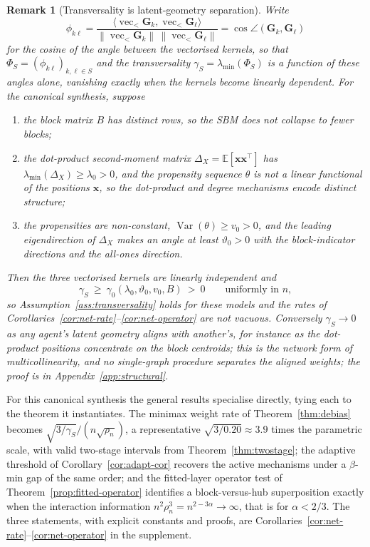 \documentclass[12pt]{article}
\newtheorem{remark}{Remark}
\newcommand{\E}{\mathbb{E}}
\newcommand{\1}{\mathbf{1}}
\newcommand{\x}{\mathbf{x}}
\newcommand{\norm}[1]{\left\lVert#1\right\rVert}
\newcommand{\inner}[2]{\langle #1, #2 \rangle}
\begin{document}
\begin{remark}[Transversality is latent-geometry separation]
\label{prop:transversality-geom}
Write
\[
\phi_{k\ell}=\frac{\inner{\operatorname{vec}_<\mathbf G_k}{\operatorname{vec}_<\mathbf G_\ell}}{\norm{\operatorname{vec}_<\mathbf G_k}\,\norm{\operatorname{vec}_<\mathbf G_\ell}}=\cos\angle(\mathbf G_k,\mathbf G_\ell)
\]
for the cosine of the angle between the vectorised kernels, so
that $\Phi_S=(\phi_{k\ell})_{k,\ell\in S}$ and the transversality $\gamma_S=\lambda_{\min}(\Phi_S)$ is a
function of these angles alone, vanishing exactly when the kernels become linearly dependent. For the
canonical synthesis, suppose
\begin{enumerate}[label=(\roman*),leftmargin=2em,itemsep=1pt]
\item the block matrix $B$ has distinct rows, so the SBM does not collapse to fewer blocks;
\item the dot-product second-moment matrix $\Delta_X=\E[\x\x^\top]$ has $\lambda_{\min}(\Delta_X)\ge
\lambda_0>0$, and the propensity sequence $\theta$ is not a linear functional of the positions $\x$, so
the dot-product and degree mechanisms encode distinct structure;
\item the propensities are non-constant, $\operatorname{Var}(\theta)\ge v_0>0$, and the leading
eigendirection of $\Delta_X$ makes an angle at least $\vartheta_0>0$ with the block-indicator
directions and the all-ones direction.
\end{enumerate}
Then the three vectorised kernels are linearly independent and
\[
\gamma_S\ \ge\ \gamma_0(\lambda_0,\vartheta_0,v_0,B)\ >\ 0\qquad\text{uniformly in }n,
\]
so Assumption~\ref{ass:transversality} holds for these models and the rates of
Corollaries~\ref{cor:net-rate}--\ref{cor:net-operator} are not vacuous. Conversely $\gamma_S\to0$ as any
agent's latent geometry aligns with another's, for instance as the dot-product positions concentrate on
the block centroids; this is the network form of multicollinearity, and no single-graph procedure
separates the aligned weights; the proof is in Appendix~\ref{app:structural}.
\end{remark}

For this canonical synthesis the general results specialise directly, tying each to the theorem it
instantiates. The minimax weight rate of Theorem~\ref{thm:debias} becomes
$\sqrt{3/\gamma_S}/(n\sqrt{\rho_n})$, a representative $\sqrt{3/0.20}\approx3.9$ times the parametric scale,
with valid two-stage intervals from Theorem~\ref{thm:twostage}; the adaptive threshold of
Corollary~\ref{cor:adapt-cor} recovers the active mechanisms under a $\beta$-min gap of the same order; and
the fitted-layer operator test of Theorem~\ref{prop:fitted-operator} identifies a block-versus-hub
superposition exactly when the interaction information $n^2\rho_n^{3}=n^{2-3\alpha}\to\infty$, that is for
$\alpha<2/3$. The three statements, with explicit constants and proofs, are
Corollaries~\ref{cor:net-rate}--\ref{cor:net-operator} in the supplement.
\end{document}

